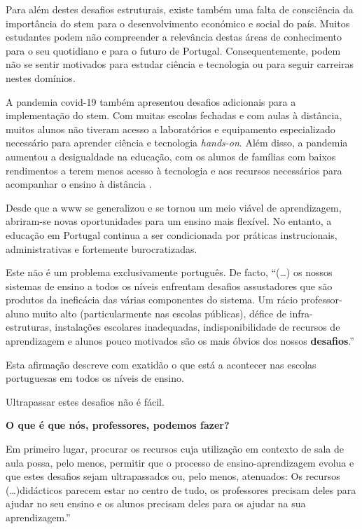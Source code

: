 Para além destes desafios estruturais, existe também uma falta de consciência da importância do \acrshort{stem} para o desenvolvimento económico e social do país. Muitos estudantes podem não compreender a relevância destas áreas de conhecimento para o seu quotidiano e para o futuro de Portugal. Consequentemente, podem não se sentir motivados para estudar ciência e tecnologia ou para seguir carreiras nestes domínios.

A pandemia \acrshort{covid-19} também apresentou desafios adicionais para a implementação do \acrshort{stem}. Com muitas escolas fechadas e com aulas à distância, muitos alunos não tiveram acesso a laboratórios e equipamento especializado necessário para aprender ciência e tecnologia \textit{hands-on}. Além disso, a pandemia aumentou a desigualdade na educação, com os alunos de famílias com baixos rendimentos a terem menos acesso à tecnologia e aos recursos necessários para acompanhar o ensino à distância \cite{desigualdadespandemia}\cite{efeitospandemiadigital}.

Desde que a \acrfull{www} se generalizou e se tornou um meio viável de aprendizagem, abriram-se novas oportunidades para um ensino mais flexível. No entanto, a educação em Portugal continua a ser condicionada por práticas instrucionais, administrativas e fortemente burocratizadas.

Este não é um problema exclusivamente português. De facto, ``(\ldots) os nossos sistemas de ensino a todos os níveis enfrentam desafios assustadores que são produtos da ineficácia das várias componentes do sistema. Um rácio professor-aluno muito alto (particularmente nas escolas públicas), défice de infra-estruturas, instalações escolares inadequadas, indisponibilidade de recursos de aprendizagem e alunos pouco motivados são os mais óbvios dos nossos \textbf{desafios}\cite{virtuallabng}.''

Esta afirmação descreve com exatidão o que está a acontecer nas escolas portuguesas em todos os níveis de ensino.

Ultrapassar estes desafios não é fácil.

\textbf{O que é que nós, professores, podemos fazer?}

Em primeiro lugar, procurar os recursos cuja utilização em contexto de sala de aula possa, pelo menos, permitir que o processo de ensino-aprendizagem evolua e que estes desafios sejam ultrapassados ou, pelo menos, atenuados: Os recursos (\ldots)didácticos parecem estar no centro de tudo, os professores precisam deles para ajudar no seu ensino e os alunos precisam deles para os ajudar na sua aprendizagem\cite{virtuallabng}.''

